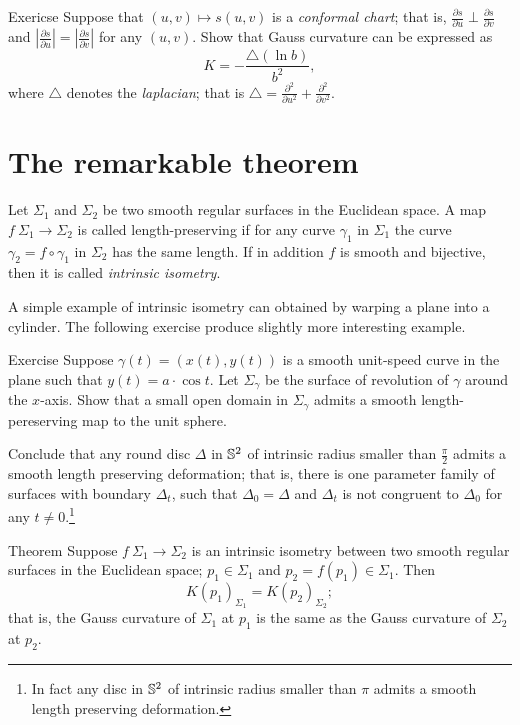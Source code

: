 \begin{thm}{Exericse}
Suppose that $(u,v)\mapsto s(u,v)$ is a \emph{conformal chart};
that is, $\tfrac{\partial s}{\partial u}\perp\tfrac{\partial s}{\partial v}$ and $|\tfrac{\partial s}{\partial u}|=|\tfrac{\partial s}{\partial v}|$ for any $(u,v)$.
Show that Gauss curvature can be expressed as 
\[K=-\frac{\triangle (\ln b)}{b^2},\]
where $\triangle$ denotes the \emph{laplacian}; that is $\triangle=\tfrac{\partial^2}{\partial u^2}+\tfrac{\partial^2}{\partial v^2}$.
\end{thm}


\section{The remarkable theorem}

Let $\Sigma_1$ and $\Sigma_2$ be two smooth regular surfaces in the Euclidean space.
A map $f\:\Sigma_1\to \Sigma_2$ is called  length-preserving if for any curve $\gamma_1$ in $\Sigma_1$ the curve $\gamma_2=f\circ\gamma_1$ in $\Sigma_2$ has the same length. %
If in addition $f$ is smooth and bijective, then it is called \emph{intrinsic isometry}. 

A simple example of intrinsic isometry can obtained by warping a plane into a cylinder.
The following exercise produce slightly more interesting example.

\begin{thm}{Exercise}\label{ex:deformation}
Suppose $\gamma(t)=(x(t),y(t))$ is a smooth unit-speed curve in the plane such that $y(t)=a\cdot \cos t$.
Let $\Sigma_\gamma$ be the surface of revolution of $\gamma$ around the $x$-axis.
Show that a small open domain in $\Sigma_\gamma$ admits a smooth length-pereserving map to the unit sphere.

Conclude that any round disc $\Delta$ in $\mathbb{S}^2$ of intrinsic radius smaller than $\tfrac\pi2$ admits a smooth length preserving deformation; that is, there is one parameter family of surfaces with boundary $\Delta_t$, such that $\Delta_0=\Delta$ and $\Delta_t$ is not congruent to $\Delta_0$ for any $t\ne0$.\footnote{In fact any disc in $\mathbb{S}^2$ of intrinsic radius smaller than $\pi$ admits a smooth length preserving deformation. %
}
\end{thm}


\begin{thm}{Theorem}\label{thm:remarkable}
Suppose $f\:\Sigma_1\to \Sigma_2$ is an intrinsic isometry between two smooth regular surfaces in  the Euclidean space; $p_1\in \Sigma_1$ and $p_2=f(p_1)\in \Sigma_1$.
Then 
\[K(p_1)_{\Sigma_1}=K(p_2)_{\Sigma_2};\]
that is, the Gauss curvature of $\Sigma_1$ at $p_1$ is the same as the Gauss curvature of $\Sigma_2$ at $p_2$.
\end{thm}

